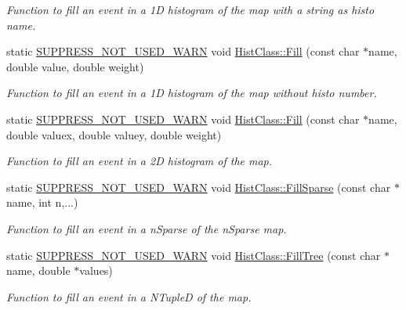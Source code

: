 \begin{DoxyCompactItemize}
\begin{DoxyCompactList}\small\item\em Function to fill an event in a 1\-D histogram of the map with a string as histo name. \end{DoxyCompactList}\item 
static \hyperlink{HistClass_8hh_a85edd6ac47f5ea2970c76af20855738c}{S\-U\-P\-P\-R\-E\-S\-S\-\_\-\-N\-O\-T\-\_\-\-U\-S\-E\-D\-\_\-\-W\-A\-R\-N} void \hyperlink{namespaceHistClass_a4f910295af0ec93ce3c0b95c4229cf7e}{Hist\-Class\-::\-Fill} (const char $\ast$name, double value, double weight)
\begin{DoxyCompactList}\small\item\em Function to fill an event in a 1\-D histogram of the map without histo number. \end{DoxyCompactList}\item 
static \hyperlink{HistClass_8hh_a85edd6ac47f5ea2970c76af20855738c}{S\-U\-P\-P\-R\-E\-S\-S\-\_\-\-N\-O\-T\-\_\-\-U\-S\-E\-D\-\_\-\-W\-A\-R\-N} void \hyperlink{namespaceHistClass_a6449381ae1c63abbdff99922f211e4da}{Hist\-Class\-::\-Fill} (const char $\ast$name, double valuex, double valuey, double weight)
\begin{DoxyCompactList}\small\item\em Function to fill an event in a 2\-D histogram of the map. \end{DoxyCompactList}\item 
static \hyperlink{HistClass_8hh_a85edd6ac47f5ea2970c76af20855738c}{S\-U\-P\-P\-R\-E\-S\-S\-\_\-\-N\-O\-T\-\_\-\-U\-S\-E\-D\-\_\-\-W\-A\-R\-N} void \hyperlink{namespaceHistClass_af9874c2196170b31d16f867dd82259de}{Hist\-Class\-::\-Fill\-Sparse} (const char $\ast$name, int n,...)
\begin{DoxyCompactList}\small\item\em Function to fill an event in a n\-Sparse of the n\-Sparse map. \end{DoxyCompactList}\item 
static \hyperlink{HistClass_8hh_a85edd6ac47f5ea2970c76af20855738c}{S\-U\-P\-P\-R\-E\-S\-S\-\_\-\-N\-O\-T\-\_\-\-U\-S\-E\-D\-\_\-\-W\-A\-R\-N} void \hyperlink{namespaceHistClass_a8956f590d0bf5e1b2ed5e9dda454b46a}{Hist\-Class\-::\-Fill\-Tree} (const char $\ast$name, double $\ast$values)
\begin{DoxyCompactList}\small\item\em Function to fill an event in a N\-Tuple\-D of the map. \end{DoxyCompactList}\item 

\end{DoxyCompactItemize}
